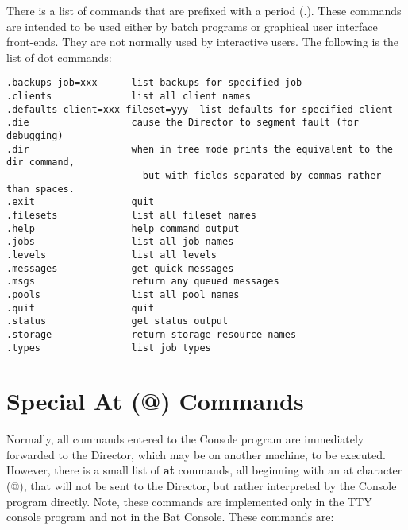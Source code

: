 There is a list of commands that are prefixed with a period (.). These
commands are intended to be used either by batch programs or graphical user
interface front-ends. They are not normally used by interactive users.
The following
is the list of dot commands:

\footnotesize
\begin{verbatim}
.backups job=xxx      list backups for specified job
.clients              list all client names
.defaults client=xxx fileset=yyy  list defaults for specified client
.die                  cause the Director to segment fault (for debugging)
.dir                  when in tree mode prints the equivalent to the dir command,
                        but with fields separated by commas rather than spaces.
.exit                 quit
.filesets             list all fileset names
.help                 help command output
.jobs                 list all job names
.levels               list all levels
.messages             get quick messages
.msgs                 return any queued messages
.pools                list all pool names
.quit                 quit
.status               get status output
.storage              return storage resource names
.types                list job types
\end{verbatim}
\normalsize


\section{Special At (@) Commands}
\label{atcommands}

Normally, all commands entered to the Console program are immediately
forwarded to the Director, which may be on another machine, to be executed.
However, there is a small list of {\bf at} commands, all beginning with an at
character (@), that will not be sent to the Director, but rather interpreted
by the Console program directly. Note, these commands are implemented only in
the TTY console program and not in the Bat Console. These commands are:

